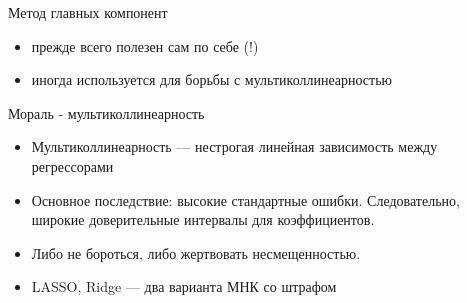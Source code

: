 \documentclass[ignorenonframetext,]{beamer}
\begin{document}
\begin{frame}{Метод главных компонент}

\begin{itemize}
\itemsep1pt\parskip0pt
\item
  прежде всего полезен сам по себе (!)
\item
  иногда используется для борьбы с мультиколлинеарностью
\end{itemize}

\end{frame}

\begin{frame}{Мораль - мультиколлинеарность}

\begin{itemize}
\item
  Мультиколлинеарность --- нестрогая линейная зависимость между
  регрессорами
\item
  Основное последствие: высокие стандартные ошибки. Следовательно,
  широкие доверительные интервалы для коэффициентов.
\item
  Либо не бороться, либо жертвовать несмещенностью.
\item
  LASSO, Ridge --- два варианта МНК со штрафом
\end{itemize}

\end{frame}
\end{document}
